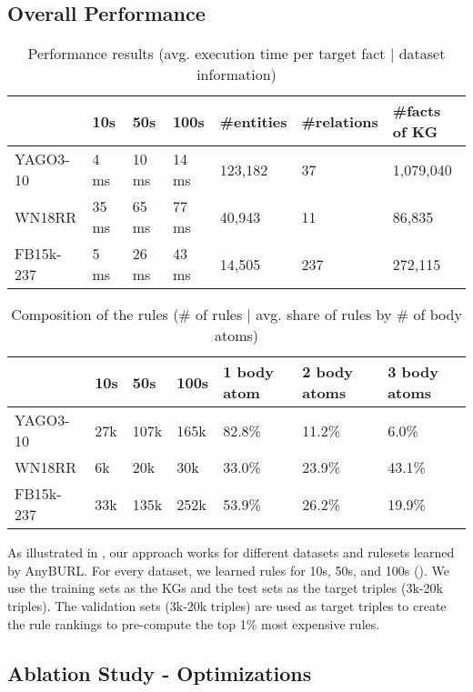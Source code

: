 \documentclass[english]{lni}
\begin{document}
\subsection{Overall Performance}

\begin{table}[t]
\centering
\begin{tabular}{l|lll|lll}
\toprule
 & 10s & 50s  & 100s & \#entities & \#relations & \#facts of KG\\
\midrule
YAGO3-10 & 4 ms & 10 ms & 14 ms & 123,182 & 37 & 1,079,040\\
WN18RR & 35 ms & 65 ms & 77 ms & 40,943 & 11 & 86,835\\
FB15k-237 & 5 ms & 26 ms & 43 ms & 14,505 & 237 & 272,115\\
\bottomrule
\end{tabular}
\caption{Performance results (avg. execution time per target fact | dataset information)}
\label{tab:overall}
\end{table}

\begin{table}[t]
\centering
\begin{tabular}{l|lll|lll}
\toprule
 & 10s & 50s & 100s & 1 body atom & 2 body atoms & 3 body atoms\\
\midrule
YAGO3-10 & 27k & 107k & 165k & 82.8\% & 11.2\% & 6.0\%\\
WN18RR & 6k & 20k & 30k & 33.0\% & 23.9\% & 43.1\%\\
FB15k-237 & 33k & 135k & 252k & 53.9\% & 26.2\% & 19.9\%\\
\bottomrule
\end{tabular}
\caption{Composition of the rules (\# of rules | avg. share of rules by \# of body atoms)}
\label{tab:rules}
\end{table}

As illustrated in , our approach works for different datasets and rulesets learned by AnyBURL. For every dataset, we learned rules for 10s, 50s, and 100s (). We use the training sets as the KGs and the test sets as the target triples (3k-20k triples). The validation sets (3k-20k triples) are used as target triples to create the rule rankings to pre-compute the top 1\% most expensive rules.

\subsection{Ablation Study - Optimizations} 
\end{document}
